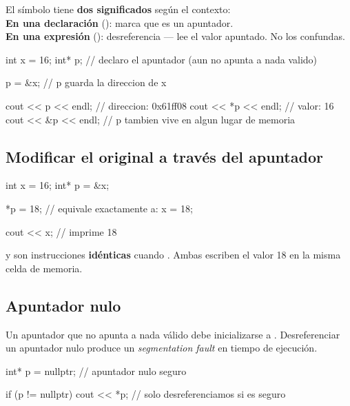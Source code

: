 \documentclass[12pt, oneside]{article}
\begin{document}
\begin{advertencia}
  El símbolo \cpp{*} tiene \textbf{dos significados} según el contexto:\\
  \textbf{En una declaración} (): marca que  es un
  apuntador.\\
  \textbf{En una expresión} (): desreferencia — lee el valor apuntado.
  No los confundas.
\end{advertencia}

\begin{codigo}[caption={Apuntador: asignacion y desreferencia}]
int  x = 16;
int* p;          // declaro el apuntador (aun no apunta a nada valido)

p = &x;          // p guarda la direccion de x

cout << p   << endl;  // direccion: 0x61ff08
cout << *p  << endl;  // valor:     16
cout << &p  << endl;  // p tambien vive en algun lugar de memoria
\end{codigo}

\subsection{Modificar el original a través del apuntador}

\begin{codigo}[caption={Escritura a traves de apuntador}]
int  x = 16;
int* p = &x;

*p = 18;    // equivale exactamente a: x = 18;

cout << x;  // imprime 18
\end{codigo}

\begin{recuerda}
   y  son instrucciones \textbf{idénticas} cuando
  . Ambas escriben el valor 18 en la misma celda de memoria.
\end{recuerda}

\subsection{Apuntador nulo}

Un apuntador que no apunta a nada válido debe inicializarse a .
Desreferenciar un apuntador nulo produce un \textit{segmentation fault} en
tiempo de ejecución.

\begin{codigo}
int* p = nullptr;   // apuntador nulo seguro

if (p != nullptr) {
    cout << *p;     // solo desreferenciamos si es seguro
}
\end{codigo}
\end{document}
